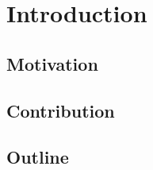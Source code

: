 
\chapter{Introduction}\label{ch:introduction}
\glsresetall %

\section{Motivation}

\section{Contribution}

\section{Outline}